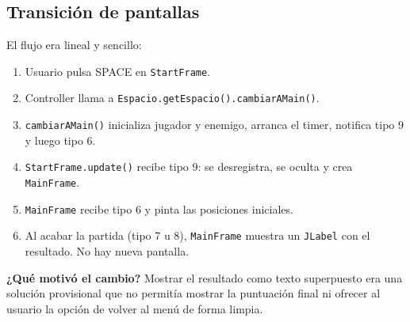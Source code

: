 \documentclass[12pt, a4paper]{article}
\begin{document}
\subsection{Transici\'{o}n de pantallas}
 
\begin{cajasprint1}
El flujo era lineal y sencillo:
\begin{enumerate}
    \item Usuario pulsa SPACE en \texttt{StartFrame}.
    \item Controller llama a \texttt{Espacio.getEspacio().cambiarAMain()}.
    \item \texttt{cambiarAMain()} inicializa jugador y enemigo, arranca el timer, notifica tipo 9 y luego tipo 6.
    \item \texttt{StartFrame.update()} recibe tipo 9: se desregistra, se oculta y crea \texttt{MainFrame}.
    \item \texttt{MainFrame} recibe tipo 6 y pinta las posiciones iniciales.
    \item Al acabar la partida (tipo 7 u 8), \texttt{MainFrame} muestra un \texttt{JLabel} con el resultado. No hay nueva pantalla.
\end{enumerate}
\end{cajasprint1}
 
\vspace{0.5em}
\textbf{¿Qu\'{e} motiv\'{o} el cambio?} Mostrar el resultado como texto superpuesto era una soluci\'{o}n provisional que no permit\'{i}a mostrar la puntuaci\'{o}n final ni ofrecer al usuario la opci\'{o}n de volver al men\'{u} de forma limpia.
 
\vspace{0.5em}
 
\end{document}
